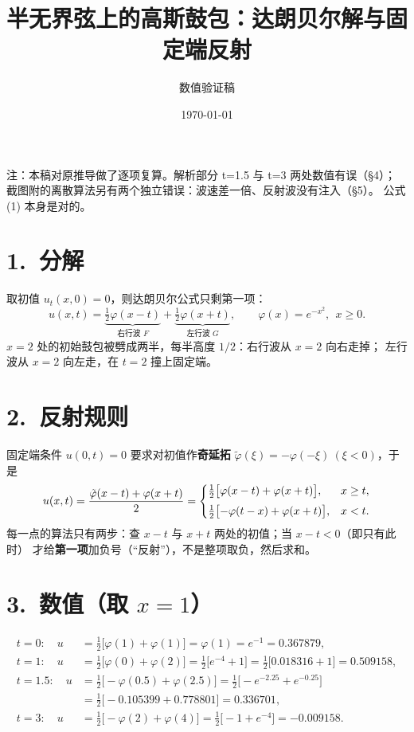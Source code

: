 \documentclass[11pt,a4paper]{ctexart}
\title{\bfseries 半无界弦上的高斯鼓包：达朗贝尔解与固定端反射}
\author{数值验证稿}
\date{\today}
\newcommand{\vp}{\varphi}
\newcommand{\warn}[1]{\textcolor{red!75!black}{#1}}
\begin{document}
\maketitle

\noindent\warn{注：本稿对原推导做了逐项复算。解析部分 t=1.5 与 t=3 两处数值有误（\S4）；
截图附的离散算法另有两个独立错误：波速差一倍、反射波没有注入（\S5）。
公式 (1) 本身是对的。}

\section*{1.\ 分解}

取初值 $u_t(x,0)=0$，则达朗贝尔公式只剩第一项：
\[
u(x,t)=\underbrace{\tfrac12\vp(x-t)}_{\text{右行波 }F}
      +\underbrace{\tfrac12\vp(x+t)}_{\text{左行波 }G},
\qquad \vp(x)=e^{-x^{2}},\ \ x\ge 0 .
\]
$x=2$ 处的初始鼓包被劈成两半，每半高度 $1/2$：右行波从 $x=2$ 向右走掉；
左行波从 $x=2$ 向左走，在 $t=2$ 撞上固定端。

\section*{2.\ 反射规则}

固定端条件 $u(0,t)=0$ 要求对初值作\textbf{奇延拓}
$\tilde\vp(\xi)=-\vp(-\xi)\ (\xi<0)$，于是
\begin{equation}
u(x,t)=\frac{\tilde\vp(x-t)+\vp(x+t)}{2}
=\begin{dcases}
  \tfrac12\bigl[\vp(x-t)+\vp(x+t)\bigr], & x\ge t,\\[2pt]
  \tfrac12\bigl[-\vp(t-x)+\vp(x+t)\bigr], & x<t .
\end{dcases}
\end{equation}
每一点的算法只有两步：查 $x-t$ 与 $x+t$ 两处的初值；当 $x-t<0$（即只有此时）
才给\textbf{第一项}加负号（“反射”），\warn{不是整项取负}，然后求和。

\section*{3.\ 数值（取 $x=1$）}

\begin{align*}
t=0:\quad
  u&=\tfrac12\bigl[\vp(1)+\vp(1)\bigr]=\vp(1)=e^{-1}=0.367879,\\[2pt]
t=1:\quad
  u&=\tfrac12\bigl[\vp(0)+\vp(2)\bigr]
     =\tfrac12\bigl[e^{-4}+1\bigr]
     =\tfrac12\bigl[0.018316+1\bigr]=0.509158,\\[2pt]
t=1.5:\quad
  u&=\tfrac12\bigl[-\vp(0.5)+\vp(2.5)\bigr]
     =\tfrac12\bigl[-e^{-2.25}+e^{-0.25}\bigr]\\[2pt]
   &=\tfrac12\bigl[-0.105399+0.778801\bigr]=0.336701,\\[2pt]
t=3:\quad
  u&=\tfrac12\bigl[-\vp(2)+\vp(4)\bigr]
     =\tfrac12\bigl[-1+e^{-4}\bigr]=-0.009158 .
\end{align*}
\end{document}
